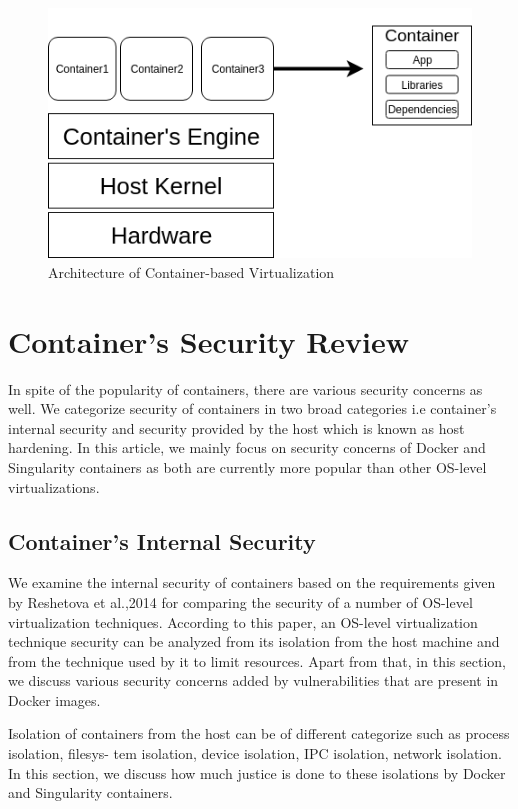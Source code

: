 \documentclass[a4paper,num-refs]{oup-contemporary}
\begin{document}
\begin{figure}
\centering
        \includegraphics[width=\columnwidth]{Figures/virtualization.png}
        \caption{Architecture of Container-based
                Virtualization}
	\label{virtualization}
\end{figure}

\section{Container's Security Review}

In spite of the popularity of containers, there are various security concerns
as well. We categorize security of containers in two broad categories i.e container's 
internal security and security provided by the host which is known as
host hardening. In this article, we mainly focus on security concerns of 
Docker and Singularity containers as both are currently more popular than other 
OS-level virtualizations. 

\subsection{Container's Internal Security}

We examine the internal security of containers based on the requirements given by
Reshetova et al.,2014 for comparing the security of a number of OS-level
virtualization techniques. According to this paper, an OS-level virtualization
technique security can be analyzed from its isolation from the host machine and from 
the technique used by it to limit resources. Apart from that, in this section, we discuss various security 
concerns added by vulnerabilities that are present in Docker images.

Isolation of containers from the host can be of different categorize such as process isolation, filesys-
tem isolation, device isolation, IPC isolation, network isolation. In this section, we discuss how
much justice is done to these isolations by Docker and Singularity containers.
\end{document}
